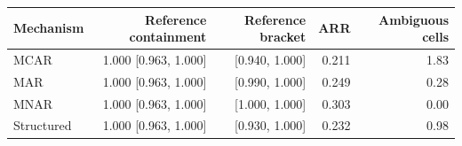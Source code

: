 \begin{tabular}{lrrrr}
\toprule
Mechanism & Reference containment & Reference bracket & ARR & Ambiguous cells \\
\midrule
MCAR & 1.000 [0.963, 1.000] & [0.940, 1.000] & 0.211 & 1.83 \\
MAR & 1.000 [0.963, 1.000] & [0.990, 1.000] & 0.249 & 0.28 \\
MNAR & 1.000 [0.963, 1.000] & [1.000, 1.000] & 0.303 & 0.00 \\
Structured & 1.000 [0.963, 1.000] & [0.930, 1.000] & 0.232 & 0.98 \\
\bottomrule
\end{tabular}
